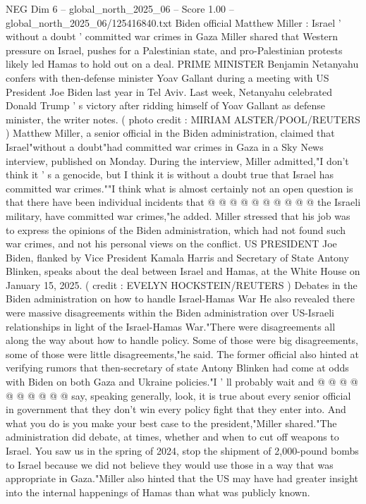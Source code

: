 \begin{textsample}{NEG Dim 6 – global\_north\_2025\_06 – Score 1.00 – global\_north\_2025\_06/125416840.txt}  \label{ex:f6_neg_422}
Biden official Matthew Miller : Israel ' without a doubt ' committed war crimes in Gaza Miller shared that Western pressure on Israel, pushes for a Palestinian state, and pro-Palestinian protests likely led Hamas to hold out on a deal.
PRIME MINISTER Benjamin Netanyahu confers with then-defense minister Yoav Gallant during a meeting with US President Joe Biden last year in Tel Aviv.
Last week, Netanyahu celebrated Donald Trump ' s victory after ridding himself of Yoav Gallant as defense minister, the writer notes. ( photo credit : MIRIAM ALSTER/POOL/REUTERS ) Matthew Miller, a senior official in the Biden administration, claimed that Israel"without a doubt"had committed war crimes in Gaza in a Sky News interview, published on Monday.
During the interview, Miller admitted,"I don't think it ' s a genocide, but I think it is without a doubt true that Israel has committed war crimes.""I think what is almost certainly not an open question is that there have been individual incidents that @ @ @ @ @ @ @ @ @ @ the Israeli military, have committed war crimes,"he added.
Miller stressed that his job was to express the opinions of the Biden administration, which had not found such war crimes, and not his personal views on the conflict.
US PRESIDENT Joe Biden, flanked by Vice President Kamala Harris and Secretary of State Antony Blinken, speaks about the deal between Israel and Hamas, at the White House on January 15, 2025. ( credit : EVELYN HOCKSTEIN/REUTERS ) Debates in the Biden administration on how to handle Israel-Hamas War He also revealed there were massive disagreements within the Biden administration over US-Israeli relationships in light of the Israel-Hamas War."There were disagreements all along the way about how to handle policy.
Some of those were big disagreements, some of those were little disagreements,"he said.
The former official also hinted at verifying rumors that then-secretary of state Antony Blinken had come at odds with Biden on both Gaza and Ukraine policies."I ' ll probably wait and @ @ @ @ @ @ @ @ @ @ say, speaking generally, look, it is true about every senior official in government that they don't win every policy fight that they enter into.
And what you do is you make your best case to the president,"Miller shared."The administration did debate, at times, whether and when to cut off weapons to Israel.
You saw us in the spring of 2024, stop the shipment of 2,000-pound bombs to Israel because we did not believe they would use those in a way that was appropriate in Gaza."Miller also hinted that the US may have had greater insight into the internal happenings of Hamas than what was publicly known.

\end{textsample}
